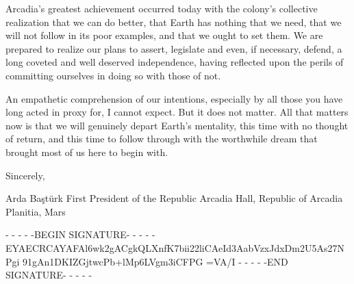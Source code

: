 Arcadia's greatest achievement occurred today with the colony's collective realization that we can do better, that Earth has nothing that we need, that we will not follow in its poor examples, and that we ought to set them. We are prepared to realize our plans to assert, legislate and even, if necessary, defend, a long coveted and well deserved independence, having reflected upon the perils of committing ourselves in doing so with those of not. 

An empathetic comprehension of our intentions, especially by all those you have long acted in proxy for, I cannot expect. But it does not matter. All that matters now is that we will genuinely depart Earth's mentality, this time with no thought of return, and this time to follow through with the worthwhile dream that brought most of us here to begin with.

Sincerely, 

\hskip 1cm 
   
Arda Baştürk
First President of the Republic
Arcadia Hall, Republic of Arcadia Planitia, Mars

- - - - -BEGIN SIGNATURE- - - - -
EYAECRCAYAFAl6wk2gACgkQLXnfK7bii22liCAeId3AabVzxJdxDm2U5As27NPgi
91gAn1DKIZGjtwcPb+lMp6LVgm3iCFPG
=VA/I
- - - - -END SIGNATURE- - - - -
\stoplines

